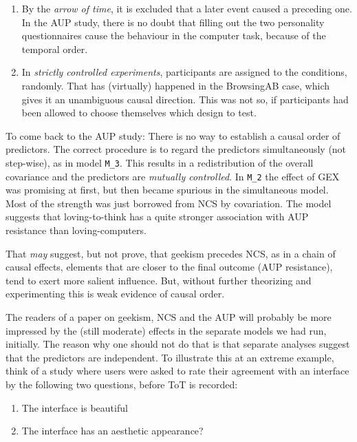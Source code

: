 \documentclass[]{svmono}
\providecommand{\tightlist}{%
  \setlength{\itemsep}{0pt}\setlength{\parskip}{0pt}}
\theoremstyle{definition}
\theoremstyle{definition}
\theoremstyle{definition}
\theoremstyle{remark}
\begin{document}
\begin{enumerate}
\def\labelenumi{\arabic{enumi}.}
\tightlist
\item
  By the \emph{arrow of time}, it is excluded that a later event caused
  a preceding one. In the AUP study, there is no doubt that filling out
  the two personality questionnaires cause the behaviour in the computer
  task, because of the temporal order.
\item
  In \emph{strictly controlled experiments}, participants are assigned
  to the conditions, randomly. That has (virtually) happened in the
  BrowsingAB case, which gives it an unambiguous causal direction. This
  was not so, if participants had been allowed to choose themselves
  which design to test.
\end{enumerate}

To come back to the AUP study: There is no way to establish a causal
order of predictors. The correct procedure is to regard the predictors
simultaneously (not step-wise), as in model \texttt{M\_3}. This results
in a redistribution of the overall covariance and the predictors are
\emph{mutually controlled}. In \texttt{M\_2} the effect of GEX was
promising at first, but then became spurious in the simultaneous model.
Most of the strength was just borrowed from NCS by covariation. The
model suggests that loving-to-think has a quite stronger association
with AUP resistance than loving-computers.

That \emph{may} suggest, but not prove, that geekism precedes NCS, as in
a chain of causal effects, elements that are closer to the final outcome
(AUP resistance), tend to exert more salient influence. But, without
further theorizing and experimenting this is weak evidence of causal
order.

The readers of a paper on geekism, NCS and the AUP will probably be more
impressed by the (still moderate) effects in the separate models we had
run, initially. The reason why one should not do that is that separate
analyses suggest that the predictors are independent. To illustrate this
at an extreme example, think of a study where users were asked to rate
their agreement with an interface by the following two questions, before
ToT is recorded:

\begin{enumerate}
\def\labelenumi{\arabic{enumi}.}
\tightlist
\item
  The interface is beautiful
\item
  The interface has an aesthetic appearance?
\end{enumerate}
\end{document}
